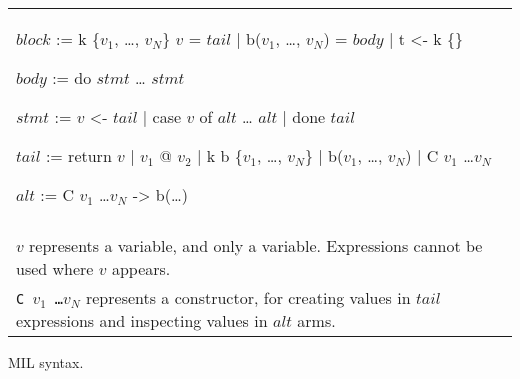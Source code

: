\begin{myfig}[th]
\begin{tabular}{p{5in}}
\begin{center}
\begin{minipage}{4in}
\begin{AVerb}[numbers=left]
  $block$ := k \{$v_1$, \dots, $v_N$\} $v$ = $tail$ \label{fig_mil3_k1} 
    | b($v_1$, \dots, $v_N$) = $body$ \label{fig_mil3_b} 
    | t <- k \{\}  \label{fig_mil3_t} 

  $body$ := do \label{fig_mil3_body}
    $stmt$ 
    \dots 
    $stmt$

  $stmt$ := $v$ <- $tail$ \label{fig_mil3_stmt}  \label{fig_mil3_bind}
    | case $v$ of \label{fig_mil3_case}
        $alt$
        \dots
        $alt$
    | done $tail$ \label{fig_mil3_done}

  $tail$ := return $v$ \label{fig_mil3_return}
    | $v_1$ @ $v_2$ \label{fig_mil3_enter}
    | k b \{$v_1$, \dots, $v_N$\} \label{fig_mil3_capture}
    | b($v_1$, \dots, $v_N$) \label{fig_mil3_goto}
    | C $v_1$ \dots $v_N$ \label{fig_mil3_const}

  $alt$ := C $v_1$ \dots $v_N$ -> b(\dots) 
\end{AVerb}
\end{minipage}
\end{center} \\ \\
  $v$ represents a variable, and only a variable. Expressions
  cannot be used where $v$ appears. \\ 

  \texttt{C $v_1$ \dots $v_N$} represents a constructor, for creating
  values in $tail$ expressions and inspecting values in $alt$ arms. \\
\end{tabular}
\caption{MIL syntax.}
\label{fig_mil3}
\end{myfig}
